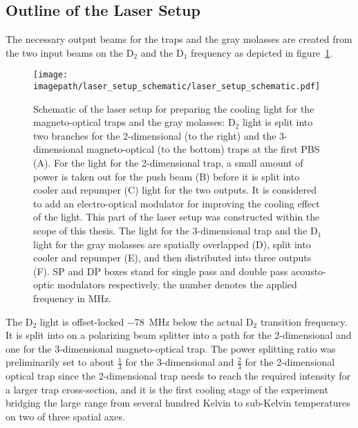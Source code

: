 \subsection*{Outline of the Laser Setup}
The necessary output beams for the traps and the gray molasses are created from the two input beams on the D$_2$ and the D$_1$ frequency as depicted in figure~\ref{fig:laser_setup_schematic}.



\begin{figure}
    \centering
    \texttt{[image: \\imagepath/laser\_setup\_schematic/laser\_setup\_schematic.pdf]}
    \caption{Schematic of the laser setup for preparing the cooling light for the magneto-optical traps and the gray molasses: D$_2$ light is split into two branches for the 2-dimensional (to the right) and the 3-dimensional magneto-optical (to the bottom) traps at the first PBS (A).
    For the light for the 2-dimensional trap, a small amount of power is taken out for the push beam (B) before it is split into cooler and repumper (C) light for the two outputs. It is considered to add an electro-optical modulator for improving the cooling effect of the light. This part of the laser setup was constructed within the scope of this thesis.
    The light for the 3-dimensional trap and the D$_1$ light for the gray molasses are spatially overlapped (D), split into cooler and repumper (E), and then distributed into three outputs (F).
    SP and DP boxes stand for single pass and double pass acousto-optic modulators respectively, the number denotes the applied frequency in \si{\mega\hertz}.
    }
    \label{fig:laser_setup_schematic}
\end{figure}

The D$_2$ light is offset-locked \SI{-78}{\mega\hertz} below the actual D$_2$ transition frequency. It is split into on a polarizing beam splitter into a path for the 2-dimensional and one for the 3-dimensional magneto-optical trap. The power splitting ratio was preliminarily set to about $\frac{1}{3}$ for the 3-dimensional and $\frac{2}{3}$ for the 2-dimensional optical trap since the 2-dimensional trap needs to reach the required intensity for a larger trap cross-section, and it is the first cooling stage of the experiment bridging the large range from several hundred Kelvin to sub-Kelvin temperatures on two of three spatial axes.

